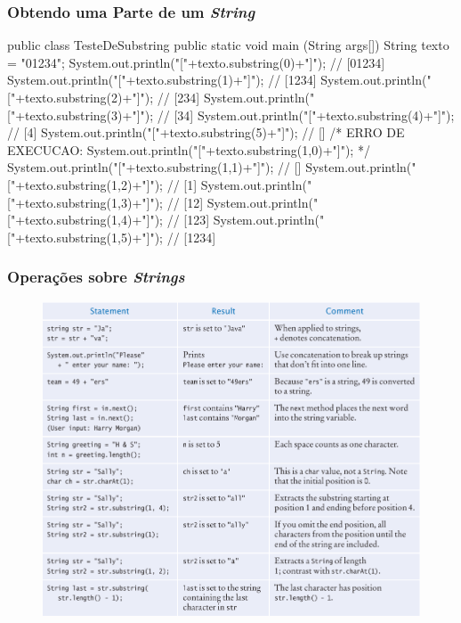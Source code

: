 \documentclass[xcolor={dvipsnames,table},aspectratio=169]{beamer}
\begin{document}
\begin{frame}[fragile]\frametitle{Obtendo uma Parte de um \emph{String}}
{\scriptsize
\begin{javacode}
public class TesteDeSubstring {
    public static void main (String args[])
    {
        String texto = "01234";
        System.out.println("["+texto.substring(0)+"]");   // [01234]
        System.out.println("["+texto.substring(1)+"]");   // [1234]
        System.out.println("["+texto.substring(2)+"]");   // [234]
        System.out.println("["+texto.substring(3)+"]");   // [34]
        System.out.println("["+texto.substring(4)+"]");   // [4]
        System.out.println("["+texto.substring(5)+"]\n"); // []
        /* ERRO DE EXECUCAO:
        System.out.println("["+texto.substring(1,0)+"]"); */
        System.out.println("["+texto.substring(1,1)+"]"); // []
        System.out.println("["+texto.substring(1,2)+"]"); // [1] 
        System.out.println("["+texto.substring(1,3)+"]"); // [12]
        System.out.println("["+texto.substring(1,4)+"]"); // [123]
        System.out.println("["+texto.substring(1,5)+"]"); // [1234]
    }
}
\end{javacode}
}
\end{frame}

\begin{frame}\frametitle{Operações sobre \emph{Strings}}
\begin{figure}[h]
	\includegraphics[height=0.7\paperheight,center]{pucrs-ep-fprog-unidade_02-tipos_de_dados_fundamentais-laminas-operacoes_sobre_strings.png}
\end{figure}
\end{frame}
\end{document}
